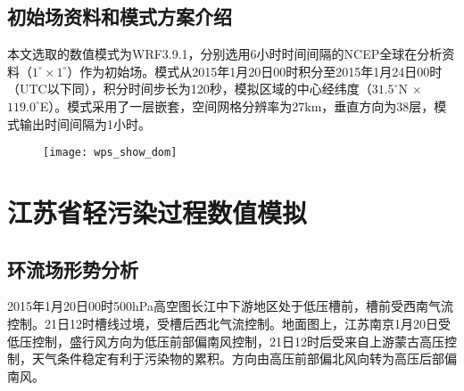 \section{初始场资料和模式方案介绍}\label{sec:qa}

本文选取的数值模式为WRF3.9.1，分别选用6小时时间间隔的NCEP全球在分析资料（$1^\circ \times 1^\circ$）作为初始场。模式从2015年1月20日00时积分至2015年1月24日00时（UTC以下同），积分时间步长为120秒，模拟区域的中心经纬度（$31.5^\circ$N $\times$ $119.0^\circ$E）。模式采用了一层嵌套，空间网格分辨率为27km，垂直方向为38层，模式输出时间间隔为1小时。

\begin{figure}[!htbp]
    \centering
    \texttt{[image: wps\_show\_dom]}
    \label{fig:wps_show_dom_trim}
\end{figure}

\chapter{江苏省轻污染过程数值模拟}\label{chap:evaluation}


\section{环流场形势分析}

2015年1月20日00时500hPa高空图长江中下游地区处于低压槽前，槽前受西南气流控制。21日12时槽线过境，受槽后西北气流控制。地面图上，江苏南京1月20日受低压控制，盛行风方向为低压前部偏南风控制，21日12时后受来自上游蒙古高压控制，天气条件稳定有利于污染物的累积。方向由高压前部偏北风向转为高压后部偏南风。

